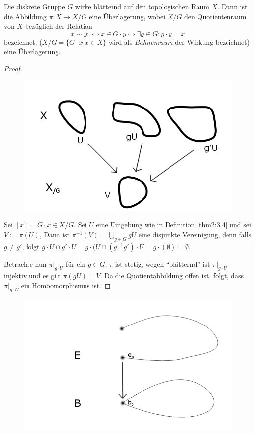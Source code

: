 \documentclass[a4paper,10pt]{scrartcl}
\begin{document}
\begin{lem}\label{thm2:3.5}
 Die diskrete Gruppe $G$ wirke blätternd auf den topologischen Raum $X$. Dann ist die Abbildung $\pi: X\to X/G$ eine Überlagerung, wobei $X/G$ den Quotientenraum von $X$ bezüglich der Relation
\[
 x\sim y :\iff x\in G\cdot y \iff \exists g\in G: g\cdot y=x
\]
bezeichnet. ($X/G=\{G\cdot x|x\in X\}$ wird als \emph{Bahnenraum} der Wirkung bezeichnet) eine Überlagerung.


\end{lem}
\begin{proof}
\begin{figure}[H]
\centering
\includegraphics[scale=0.3]{fig76.png} 
\caption{}
\end{figure}
 Sei $[x]=G\cdot x\in X/G$. Sei $U$ eine Umgebung wie in Definition \ref{thm2:3.4} und sei $V:=\pi(U)$, Dann ist $\pi^{-1}(V)=\bigcup_{g\in G} gU$ eine disjunkte Vereinigung, denn falls $g\neq g'$, folgt $g\cdot U \cap g'\cdot U=g\cdot (U\cap(g^{-1}g') \cdot U =g\cdot(\emptyset)=\emptyset$.

Betrachte nun $\pi|_{g\cdot U}$ für ein $g\in G$, $\pi$ ist stetig, wegen "`blätternd"' ist $\pi|_{g\cdot U}$ injektiv und es gilt $\pi(gU)=V$.
Da die Quotientabbildung offen ist, folgt, dass  $\pi|_{g\cdot U}$ ein Homöomorphismus ist.
\end{proof}
\begin{figure}[H]
\centering
\includegraphics[scale=0.3]{fig77.png} 
\caption{}
\end{figure}
\end{document}
